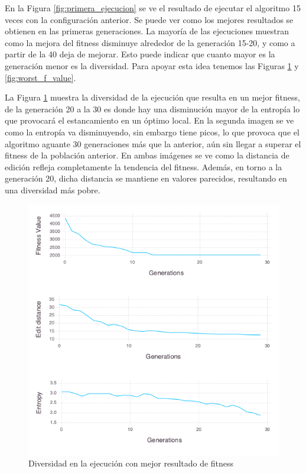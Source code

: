 En la Figura \ref{fig:primera_ejecucion} se ve el resultado de ejecutar el algoritmo 15 veces con la configuración anterior.
Se puede ver como los mejores resultados se obtienen en las primeras generaciones. La mayoría de las ejecuciones muestran como la mejora
del fitness disminuye alrededor de la generación 15-20, y como a partir de la 40 deja de mejorar. Esto puede indicar que cuanto mayor es la generación menor es la 
diversidad. Para apoyar esta idea tenemos las Figuras \ref{fig:best_f_value} y \ref{fig:worst_f_value}. 

La Figura \ref{fig:best_f_value} muestra la diversidad de la ejecución que resulta en un mejor fitness, de la generación 20 a la 30 es donde hay una 
disminución mayor de la entropía lo que provocará el estancamiento en un óptimo local. En la segunda imagen se ve como la entropía va disminuyendo, sin 
embargo tiene picos, lo que provoca que el algoritmo aguante 30 generaciones más que la anterior, aún sin llegar a superar el fitness de la población anterior. En
ambas imágenes se ve como la distancia de edición refleja completamente la tendencia del fitness. Además, en torno a la generación 20, dicha distancia se mantiene
en valores parecidos, resultando en una diversidad más pobre.

\begin{figure}[]
	\centering	
	\includegraphics[scale=0.5]{figuras/config_file_1_Rastrigin_best_f_value.png}
	\caption{ Diversidad en la ejecución con mejor resultado de fitness }
    \label{fig:best_f_value}
\end{figure}

